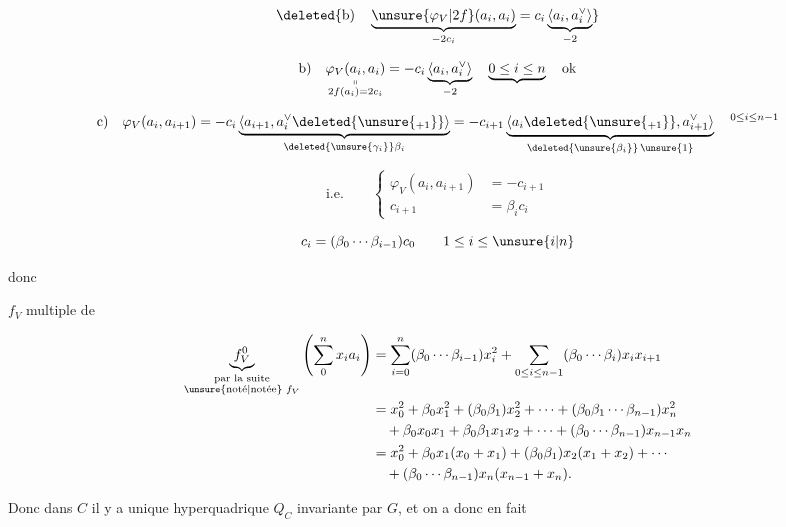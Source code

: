 
\[
\deleted{\text{b)}\quad\underbrace{\unsure{\varphi_V|2f}(a_i,a_i)}_{-2c_i}=c_i\underbrace{\langle a_i,a_i^\vee\rangle}_{-2}}
\]

\[
\text{b)}\quad\underset{\substack{\shortparallel\\2f(a_i)=2c_i}}{\varphi_V(a_i,a_i)}
=-c_i\underbrace{\langle a_i,a_i^\vee\rangle}_{-2}
\quad \underbrace{0\leq i\leq n}\quad\text{ok}
\]

\[
\text{c)}\quad\varphi_V(a_i,a_{i+1})=-c_i
 \underbrace{\langle a_{i+1},a_i^{\vee}\deleted{\unsure{{}_{+1}}}\rangle}_{\deleted{\unsure{\gamma_i}}\beta_i}
=-c_{i+1}\underbrace{\langle a_i\deleted{\unsure{{}_{+1}}},a_{i+1}^{\vee}\rangle}_{\deleted{\unsure{\beta_i}}\,\unsure{1}}
\quad {}^{0\leq i\leq n-1}
\]

\[
\text{i.e.}\qquad\left\{\begin{aligned}
\varphi_V(a_i,a_{i+1})&=-c_{i+1}\\
c_{i+1}&=\beta_i c_i
\end{aligned}\right.
\]

\[
c_i=(\beta_0\cdots\beta_{i-1})c_0\qquad 1\leq i\leq\unsure{i|n}
\]

donc

$f_V$ multiple de

\[
\begin{aligned}
\underbrace{f_V^0}_{\substack{\text{par la suite}\\\text{\unsure{noté|notée} }f_V}}
 \left(\sum_0^n x_i a_i\right)
 &=\sum_{i=0}^n(\beta_0\cdots\beta_{i-1})x_i^2
   +\sum_{0\leq i\leq n-1}(\beta_0\cdots\beta_i)x_i x_{i+1}\\
 &=x_0^2+\beta_0x_1^2+(\beta_0\beta_1)x_2^2+\cdots+(\beta_0\beta_1\cdots\beta_{n-1})x_n^2\\
 &\quad+\beta_0x_0x_1+\beta_0\beta_1x_1x_2+\cdots+
 (\beta_0\cdots\beta_{n-1})x_{n-1}x_n\\
 &=x_0^2+\beta_0x_1(x_0+x_1)+(\beta_0\beta_1)x_2(x_1+x_2)+\cdots\\
 &\quad+(\beta_0\cdots\beta_{n-1})x_n(x_{n-1}+x_n).
\end{aligned}
\]

Donc dans $C$ il y a unique hyperquadrique $Q_C$  invariante par  $G$, et on a donc en fait


